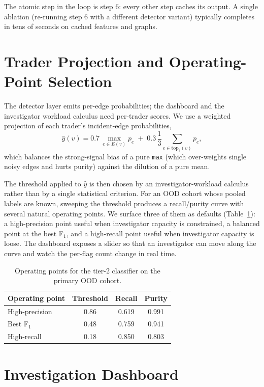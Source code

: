 \documentclass[10pt,twocolumn,letterpaper]{article}
\begin{document}
The atomic step in the loop is step 6: every other step caches its
output. A single ablation (re-running step 6 with a different detector
variant) typically completes in tens of seconds on cached features and
graphs.
\section{Trader Projection and Operating-Point Selection}
\label{sec:projection}

The detector layer emits per-edge probabilities; the dashboard and the
investigator workload calculus need per-trader scores. We use a
weighted projection of each trader's incident-edge probabilities,
\begin{equation}
\hat{y}(v) = 0.7\,\max_{e\in E(v)} p_e
\;+\;0.3\,\frac{1}{3}\!\!\sum_{e\in\mathrm{top}_3(v)}\!\!p_e ,
\label{eq:proj}
\end{equation}
which balances the strong-signal bias of a pure \texttt{max} (which
over-weights single noisy edges and hurts purity) against the
dilution of a pure mean.

The threshold applied to \(\hat{y}\) is then chosen by an
investigator-workload calculus rather than by a single statistical
criterion. For an OOD cohort whose pooled labels are known, sweeping
the threshold produces a recall/purity curve with several natural
operating points. We surface three of them as defaults
(Table~\ref{tab:ops}): a high-precision point useful when investigator
capacity is constrained, a balanced point at the best F\(_1\), and a
high-recall point useful when investigator capacity is loose. The
dashboard exposes a slider so that an investigator can move along the
curve and watch the per-flag count change in real time.

\begin{table}[t]
\caption{Operating points for the tier-2 classifier on the primary OOD cohort.}
\label{tab:ops}
\centering
\footnotesize
\begin{tabular}{lccc}
\toprule
Operating point & Threshold & Recall & Purity \\
\midrule
High-precision & 0.86 & 0.619 & 0.991 \\
Best F$_1$ & 0.48 & 0.759 & 0.941 \\
High-recall & 0.18 & 0.850 & 0.803 \\
\bottomrule
\end{tabular}
\end{table}

\section{Investigation Dashboard}
\label{sec:dashboard}
\end{document}
